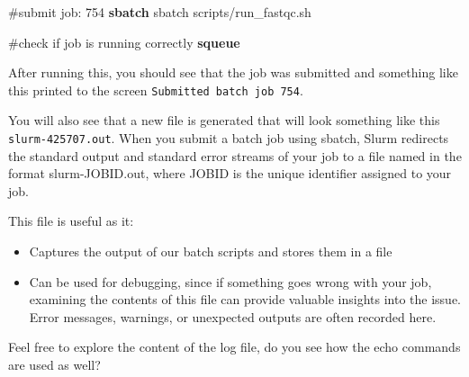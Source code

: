 \documentclass[
  letterpaper,
  DIV=11,
  numbers=noendperiod]{scrreprt}
\newenvironment{Shaded}{}{}
\newcommand{\CommentTok}[1]{\textcolor[rgb]{0.42,0.45,0.49}{#1}}
\newcommand{\ExtensionTok}[1]{\textcolor[rgb]{0.84,0.23,0.29}{\textbf{#1}}}
\newcommand{\NormalTok}[1]{\textcolor[rgb]{0.14,0.16,0.18}{#1}}
\providecommand{\tightlist}{%
  \setlength{\itemsep}{0pt}\setlength{\parskip}{0pt}}\usepackage{longtable,booktabs,array}
\begin{document}
\begin{Shaded}
\begin{Highlighting}[]
\CommentTok{\#submit job: 754}
\ExtensionTok{sbatch}\NormalTok{ sbatch scripts/run\_fastqc.sh}

\CommentTok{\#check if job is running correctly}
\ExtensionTok{squeue}
\end{Highlighting}
\end{Shaded}

After running this, you should see that the job was submitted and
something like this printed to the screen
\texttt{Submitted\ batch\ job\ 754}.

You will also see that a new file is generated that will look something
like this \texttt{slurm-425707.out}. When you submit a batch job using
sbatch, Slurm redirects the standard output and standard error streams
of your job to a file named in the format slurm-JOBID.out, where JOBID
is the unique identifier assigned to your job.

This file is useful as it:

\begin{itemize}
\tightlist
\item
  Captures the output of our batch scripts and stores them in a file
\item
  Can be used for debugging, since if something goes wrong with your
  job, examining the contents of this file can provide valuable insights
  into the issue. Error messages, warnings, or unexpected outputs are
  often recorded here.
\end{itemize}

Feel free to explore the content of the log file, do you see how the
echo commands are used as well?
\end{document}
